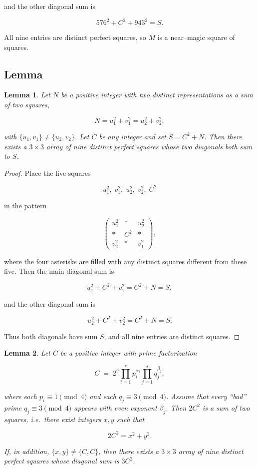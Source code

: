 \documentclass[12pt]{article}
\newtheorem{lemma}{Lemma}
\newtheorem{proof}{Proof}
\begin{document}
and the other diagonal sum is


\[
576^2 + C^2 + 943^2 = S.
\]


All nine entries are distinct perfect squares, so $M$ is a near--magic square of squares.

\subsection*{Lemma}

\begin{lemma}
Let $N$ be a positive integer with two distinct representations as a sum of two squares,


\[
N = u_1^2 + v_1^2 = u_2^2 + v_2^2,
\]


with $\{u_1,v_1\} \neq \{u_2,v_2\}$.  
Let $C$ be any integer and set $S = C^2 + N$.  
Then there exists a $3\times3$ array of nine distinct perfect squares whose two diagonals both sum to $S$.
\end{lemma}

\begin{proof}
Place the five squares


\[
u_1^2,\; v_1^2,\; u_2^2,\; v_2^2,\; C^2
\]


in the pattern


\[
\begin{pmatrix}
u_1^2 & * & u_2^2\\
*     & C^2 & *\\
v_2^2 & * & v_1^2
\end{pmatrix},
\]


where the four asterisks are filled with any distinct squares different from these five.  
Then the main diagonal sum is


\[
u_1^2 + C^2 + v_1^2 = C^2 + N = S,
\]


and the other diagonal sum is


\[
u_2^2 + C^2 + v_2^2 = C^2 + N = S.
\]


Thus both diagonals have sum $S$, and all nine entries are distinct squares.
\end{proof}

\begin{lemma}
Let $C$ be a positive integer with prime factorization


\[
C \;=\; 2^{\gamma}\prod_{i=1}^r p_i^{\alpha_i}\prod_{j=1}^s q_j^{\beta_j},
\]


where each $p_i \equiv 1 \pmod{4}$ and each $q_j \equiv 3 \pmod{4}$.  
Assume that every ``bad'' prime $q_j \equiv 3 \pmod{4}$ appears with even exponent $\beta_j$.  
Then $2C^2$ is a sum of two squares, i.e.\ there exist integers $x,y$ such that


\[
2C^2 = x^2 + y^2.
\]


If, in addition, $\{x,y\} \neq \{C,C\}$, then there exists a $3\times 3$ array of nine distinct perfect squares whose diagonal sum is $3C^2$.
\end{lemma}
\end{document}
